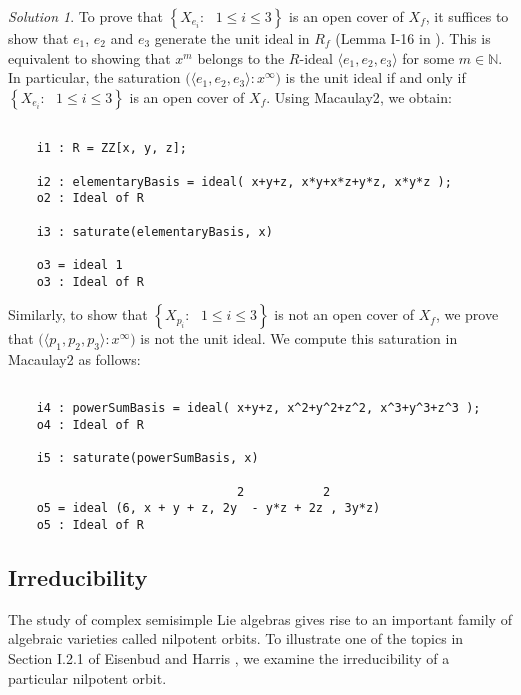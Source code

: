 \documentclass[12pt,noamsfonts]{amsart}
\def\NN{{\mathbb N}}
\theoremstyle{definition}
\theoremstyle{remark}
\newtheorem*{solution}{Solution}
\begin{document}
\begin{solution}
To prove that $\left\{ X_{e_{i}} : \text{ $1 \leq i \leq 3$} \right\}$
is an open cover of $X_{f}$, it suffices to show that $e_{1}$, $e_{2}$
and $e_{3}$ generate the unit ideal in $R_{f}$ (Lemma I-16 in
 \cite{EH}).  This is equivalent to showing that
$x^{m}$ belongs to the $R$-ideal
$\langle e_{1}, e_{2}, e_{3} \rangle$
for some $m \in \NN$.
In particular, the saturation
$\big( \langle e_{1}, e_{2}, e_{3} \rangle : x^{\infty} \big)$ is the
unit ideal if and only if $\left\{ X_{e_{i}} : \text{ $1 \leq i \leq
3$} \right\}$ is an open cover of $X_{f}$.  Using {\sc Macaulay2}, we
obtain: 
{\scriptsize
\begin{verbatim}

    i1 : R = ZZ[x, y, z];
    
    i2 : elementaryBasis = ideal( x+y+z, x*y+x*z+y*z, x*y*z );
    o2 : Ideal of R
    
    i3 : saturate(elementaryBasis, x)
    
    o3 = ideal 1
    o3 : Ideal of R

\end{verbatim}}
Similarly, to show that $\left\{ X_{p_{i}} : \text{ $1 \leq i \leq 3$}
\right\}$ is not an open cover of $X_{f}$, we prove that $\big(
\langle p_{1}, p_{2}, p_{3} \rangle : x^{\infty} \big)$ is not the
unit ideal.  We compute this saturation in {\sc Macaulay2} as follows:
{\scriptsize
\begin{verbatim}

    i4 : powerSumBasis = ideal( x+y+z, x^2+y^2+z^2, x^3+y^3+z^3 );
    o4 : Ideal of R

    i5 : saturate(powerSumBasis, x)

                                2           2
    o5 = ideal (6, x + y + z, 2y  - y*z + 2z , 3y*z)
    o5 : Ideal of R

\end{verbatim}}
\end{solution}

\subsection*{Irreducibility}

The study of complex semisimple Lie algebras gives rise to an
important family of algebraic varieties called nilpotent orbits.
To illustrate one of the topics in Section I.2.1 of
Eisenbud and Harris \cite{EH}, we examine the irreducibility of a
particular nilpotent orbit.
\end{document}
